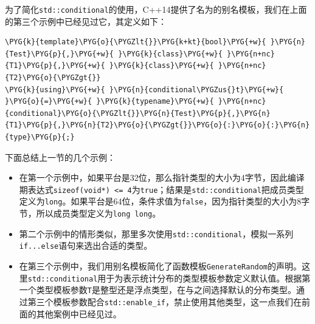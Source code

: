 
为了简化\texttt{std::\allowbreak{}conditional}的使用，C++14提供了名为的别名模板，我们在上面的第三个示例中已经见过它，其定义如下：



\begin{codeblockbg}
\begin{Verbatim}[commandchars=\\\{\},breaklines=true,breakanywhere=true,fontsize=\codefont,xleftmargin=17bp]
\PYG{k}{template}\PYG{o}{\PYGZlt{}}\PYG{k+kt}{bool}\PYG{+w}{ }\PYG{n}{Test}\PYG{p}{,}\PYG{+w}{ }\PYG{k}{class}\PYG{+w}{ }\PYG{n+nc}{T1}\PYG{p}{,}\PYG{+w}{ }\PYG{k}{class}\PYG{+w}{ }\PYG{n+nc}{T2}\PYG{o}{\PYGZgt{}}
\PYG{k}{using}\PYG{+w}{ }\PYG{n}{conditional\PYGZus{}t}\PYG{+w}{ }\PYG{o}{=}\PYG{+w}{ }\PYG{k}{typename}\PYG{+w}{ }\PYG{n+nc}{conditional}\PYG{o}{\PYGZlt{}}\PYG{n}{Test}\PYG{p}{,}\PYG{n}{T1}\PYG{p}{,}\PYG{n}{T2}\PYG{o}{\PYGZgt{}}\PYG{o}{:}\PYG{o}{:}\PYG{n}{type}\PYG{p}{;}
\end{Verbatim}
\end{codeblockbg}



下面总结上一节的几个示例：



\begin{itemize}
\item 在第一个示例中，如果平台是32位，那么指针类型的大小为4字节，因此编译期表达式\texttt{sizeof(\allowbreak{}void*) <\allowbreak{}= 4}为\texttt{true}；结果是\texttt{std::\allowbreak{}conditional}把成员类型定义为\texttt{long}。如果平台是64位，条件求值为\texttt{false}，因为指针类型的大小为8字节，所以成员类型定义为\texttt{long long}。



\item 第二个示例中的情形类似，那里多次使用\texttt{std::\allowbreak{}conditional}，模拟一系列\texttt{if...\allowbreak{}else}语句来选出合适的类型。



\item 在第三个示例中，我们用别名模板简化了函数模板\texttt{GenerateRandom}的声明。这里\texttt{std::\allowbreak{}conditional}用于为表示统计分布的类型模板参数定义默认值。根据第一个类型模板参数\texttt{T}是整型还是浮点类型，在与之间选择默认的分布类型。通过第三个模板参数配合\texttt{std::\allowbreak{}enable\_\allowbreak{}if}，禁止使用其他类型，这一点我们在前面的其他案例中已经见过。

\end{itemize}


